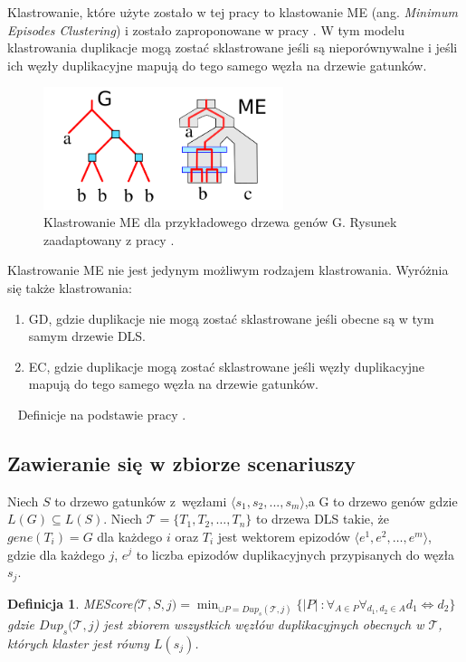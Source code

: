\documentclass[licencjacka]{pracamgr}
\newtheorem{defi}{Definicja}[section]
\begin{document}
Klastrowanie, które użyte zostało w tej pracy to klastowanie ME (ang. \textit{Minimum Episodes Clustering}) i zostało zaproponowane w pracy \cite{guigo}. W tym modelu klastrowania duplikacje mogą zostać sklastrowane jeśli są nieporównywalne i jeśli ich węzły duplikacyjne mapują do tego samego węzła na drzewie gatunków.

\begin{figure}[H]
  \centering
  \includegraphics[width=70mm]{./pictures/clas_type_me.png}
  \caption{Klastrowanie ME dla przykładowego drzewa genów G. Rysunek zaadaptowany z pracy \cite{pasz}.}
\end{figure}


Klastrowanie ME nie jest jedynym możliwym rodzajem klastrowania. Wyróżnia się także klastrowania:
\begin{enumerate}
\item GD, gdzie duplikacje nie mogą zostać sklastrowane jeśli obecne są w tym samym drzewie DLS.
\item EC, gdzie duplikacje mogą zostać sklastrowane jeśli węzły duplikacyjne mapują do tego samego węzła na drzewie gatunków.
\end{enumerate}
~\linebreak
Definicje na podstawie pracy \cite{pasz}.

\subsection{Zawieranie się w zbiorze scenariuszy}
Niech $S$ to drzewo gatunków z~węzłami $\langle s_1,s_2, ... , s_m \rangle$,a G to drzewo genów gdzie $L(G) \subseteq L(S)$.
Niech $\mathcal{T}=\{T_1,T_2, \dots , T_n\}$ to drzewa DLS takie, że $gene(T_i)=G$ dla każdego $i$ oraz $T_i$ jest wektorem epizodów $\langle e^1,e^2, \dots , e^m \rangle$, gdzie dla każdego $j$, $e^j$ to liczba epizodów duplikacyjnych przypisanych do węzła $s_j$.

\begin{defi}\label{MEs}
  MEScore($\mathcal{T}, S, j) = \min_{\cup P = {Dup}_s(\mathcal{T},j)} \lbrace \vert P \vert\ : \forall_{A \in P} \forall_{d_1,d_2 \in A} d_1 \Longleftrightarrow d_2 \rbrace$
 gdzie ${Dup}_s(\mathcal{T},j$) jest zbiorem wszystkich węzłów duplikacyjnych obecnych w $\mathcal{T}$, których klaster jest równy $L(s_j)$. 
\end{defi}
\end{document}

